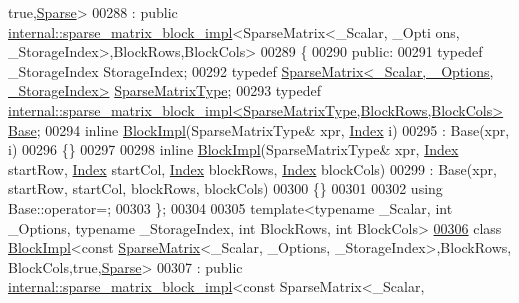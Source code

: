 \begin{DoxyCode}
      true,\hyperlink{struct_eigen_1_1_sparse}{Sparse}>
00288   : \textcolor{keyword}{public} \hyperlink{class_eigen_1_1internal_1_1sparse__matrix__block__impl}{internal::sparse\_matrix\_block\_impl}<SparseMatrix<\_Scalar, \_Opti
      ons, \_StorageIndex>,BlockRows,BlockCols>
00289 \{
00290 \textcolor{keyword}{public}:
00291   \textcolor{keyword}{typedef} \_StorageIndex StorageIndex;
00292   \textcolor{keyword}{typedef} \hyperlink{group___sparse_core___module_class_eigen_1_1_sparse_matrix}{SparseMatrix<\_Scalar, \_Options, \_StorageIndex>} 
      \hyperlink{group___sparse_core___module_class_eigen_1_1_sparse_matrix}{SparseMatrixType};
00293   \textcolor{keyword}{typedef} 
      \hyperlink{class_eigen_1_1internal_1_1sparse__matrix__block__impl}{internal::sparse\_matrix\_block\_impl<SparseMatrixType,BlockRows,BlockCols>}
       \hyperlink{class_eigen_1_1internal_1_1sparse__matrix__block__impl}{Base};
00294   \textcolor{keyword}{inline} \hyperlink{class_eigen_1_1_block_impl}{BlockImpl}(SparseMatrixType& xpr, \hyperlink{group___core___module_a554f30542cc2316add4b1ea0a492ff02}{Index} i)
00295     : Base(xpr, i)
00296   \{\}
00297 
00298   \textcolor{keyword}{inline} \hyperlink{class_eigen_1_1_block_impl}{BlockImpl}(SparseMatrixType& xpr, \hyperlink{group___core___module_a554f30542cc2316add4b1ea0a492ff02}{Index} startRow, \hyperlink{group___core___module_a554f30542cc2316add4b1ea0a492ff02}{Index} startCol, 
      \hyperlink{group___core___module_a554f30542cc2316add4b1ea0a492ff02}{Index} blockRows, \hyperlink{group___core___module_a554f30542cc2316add4b1ea0a492ff02}{Index} blockCols)
00299     : Base(xpr, startRow, startCol, blockRows, blockCols)
00300   \{\}
00301 
00302   \textcolor{keyword}{using} Base::operator=;
00303 \};
00304 
00305 \textcolor{keyword}{template}<\textcolor{keyword}{typename} \_Scalar, \textcolor{keywordtype}{int} \_Options, \textcolor{keyword}{typename} \_StorageIndex, \textcolor{keywordtype}{int} BlockRows, \textcolor{keywordtype}{int} BlockCols>
\hyperlink{class_eigen_1_1_block_impl_3_01const_01_sparse_matrix_3_01___scalar_00_01___options_00_01___store3fd33d94eaf95572721ac85ec6beb63}{00306} \textcolor{keyword}{class }\hyperlink{class_eigen_1_1_block_impl}{BlockImpl}<const \hyperlink{group___sparse_core___module_class_eigen_1_1_sparse_matrix}{SparseMatrix}<\_Scalar, \_Options, \_StorageIndex>,BlockRows,
      BlockCols,true,\hyperlink{struct_eigen_1_1_sparse}{Sparse}>
00307   : \textcolor{keyword}{public} \hyperlink{class_eigen_1_1internal_1_1sparse__matrix__block__impl}{internal::sparse\_matrix\_block\_impl}<const SparseMatrix<\_Scalar,

\end{DoxyCode}
